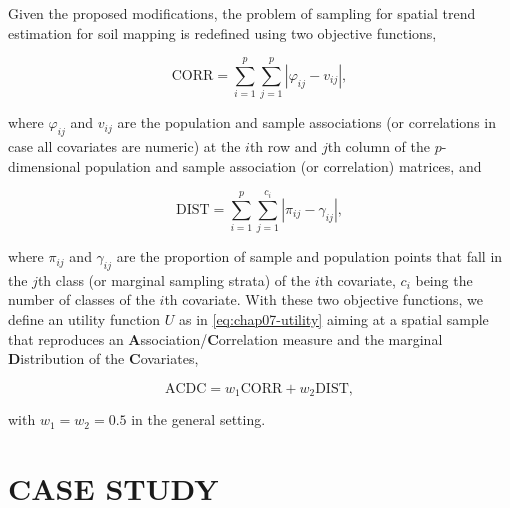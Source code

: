Given the proposed modifications, the problem of sampling for spatial trend estimation for soil mapping is 
redefined using two objective functions,

\begin{equation}
 \text{CORR} = \sum_{i=1}^{p}\sum_{j=1}^{p}|\varphi_{ij} - v_{ij}|,
\end{equation}\label{eq:chap07-corr}

\noindent where $\varphi_{ij}$ and $v_{ij}$ are the population and sample associations (or correlations in 
case all covariates are numeric) at the $i$th row and $j$th column of the $p$-dimensional population and 
sample association (or correlation) matrices, and

\begin{equation}
 \text{DIST} = \sum_{i=1}^{p}\sum_{j=1}^{c_i} |\pi_{ij} - \gamma_{ij}|,
\end{equation}\label{eq:chap07-dist}

\noindent where $\pi_{ij}$ and $\gamma_{ij}$ are the proportion of sample and population points that fall 
in the $j$th class (or marginal sampling strata) of the $i$th covariate, $c_i$ being the number of classes of 
the $i$th covariate. With these two objective functions, we define an utility function $U$ as in 
\autoref{eq:chap07-utility} aiming at a spatial sample that reproduces an 
\textbf{A}ssociation/\textbf{C}orrelation measure and the marginal \textbf{D}istribution of the 
\textbf{C}ovariates,

\begin{equation}
 \text{ACDC} = w_1\text{CORR} + w_2 \text{DIST},
\end{equation}\label{eq:chap07-acdc}

\noindent with $w_1 = w_2 = 0.5$ in the general setting.

\section{CASE STUDY}

